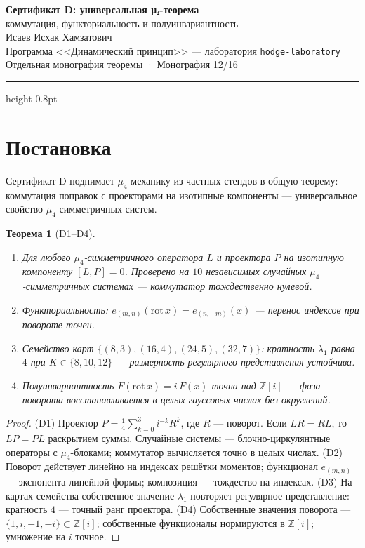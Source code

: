 \documentclass[11pt,a4paper]{article}
\theoremstyle{plain}
\newtheorem{theorem}{Теорема}
\theoremstyle{definition}
\theoremstyle{remark}
\newcommand{\ZZ}{\mathbb{Z}}
\begin{document}
\begin{center}
{\LARGE\bfseries Сертификат D: универсальная μ₄-теорема}\\[0.4em]
{\large коммутация, функториальность и полуинвариантность}\\[0.6em]
{\normalsize Исаев Исхак Хамзатович}\\[0.2em]
{\small Программа <<Динамический принцип>> --- лаборатория \texttt{hodge-laboratory}}\\[0.15em]
{\small Отдельная монография теоремы · Монография 12/16}
\end{center}
\vspace{0.4em}
{\color{linkblue}\hrule height 0.8pt}
\vspace{0.8em}

\section{Постановка}

Сертификат D поднимает $\mu_4$-механику из частных стендов в общую
теорему: коммутация поправок с проекторами на изотипные компоненты
--- универсальное свойство $\mu_4$-симметричных систем.

\begin{theorem}[D1--D4]\label{th:Dstand}
\begin{enumerate}[leftmargin=2em]
\item[(D1)] Для любого $\mu_4$-симметричного оператора $L$ и
проектора $P$ на изотипную компоненту $[L,P]=0$. Проверено на
$10$ независимых случайных $\mu_4$-симметричных системах ---
коммутатор тождественно нулевой.
\item[(D2)] Функториальность:
$e_{(m,n)}(\mathrm{rot}\,x)=e_{(n,-m)}(x)$ --- перенос индексов
при повороте точен.
\item[(D3)] Семейство карт $\{(8,3),(16,4),(24,5),(32,7)\}$:
кратность $\lambda_1$ равна $4$ при $K\in\{8,10,12\}$ ---
размерность регулярного представления устойчива.
\item[(D4)] Полуинвариантность $F(\mathrm{rot}\,x)=i\,F(x)$ точна
над $\ZZ[i]$ --- фаза поворота восстанавливается в целых гауссовых
числах без округлений.
\end{enumerate}
\end{theorem}

\begin{proof}
(D1) Проектор $P=\frac14\sum_{k=0}^3 i^{-k}R^k$, где $R$ --- поворот.
Если $LR=RL$, то $LP=PL$ раскрытием суммы. Случайные системы ---
блочно-циркулянтные операторы с $\mu_4$-блоками; коммутатор
вычисляется точно в целых числах.
(D2) Поворот действует линейно на индексах решётки моментов;
функционал $e_{(m,n)}$ --- экспонента линейной формы; композиция ---
тождество на индексах.
(D3) На картах семейства собственное значение $\lambda_1$ повторяет
регулярное представление: кратность $4$ --- точный ранг проектора.
(D4) Собственные значения поворота --- $\{1,i,-1,-i\}\subset\ZZ[i]$;
собственные функционалы нормируются в $\ZZ[i]$; умножение на $i$
точное.
\end{proof}
\end{document}
